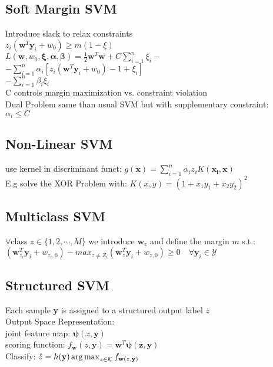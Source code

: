\subsection*{Soft Margin SVM}
Introduce slack to relax constraints\\
$z_i(\mathbf{w}^T\mathbf{y}_i+w_0)\geq m(1-\xi)$\\
$L(\mathbf{w}, w_0,\mathbf{\xi}, \mathbf{\alpha}, \mathbf{\beta}) {=}\frac{1}{2}\mathbf{w}^T\mathbf{w}+C\sum_{i=1}^n\xi_i-$\\
${-}\sum_{i=1}^n\alpha_i[z_i(\mathbf{w}^T\mathbf{y}_i{+}w_0){-}1{+}\xi_i]$\\
${-}\sum_{i=1}^n\beta_i\xi_i$\\
C controls margin maximization vs. constraint violation\\
Dual Problem same than usual SVM but with supplementary constraint:\\
$\alpha_i\leq C$

\subsection*{Non-Linear SVM}
use kernel in discriminant funct: $g(\mathbf{x})=\sum_{i=1}^n\alpha_iz_iK(\mathbf{x_i},\mathbf{x})$\\
E.g solve the XOR Problem with:
$K(x,y)=(1+x_1y_1+x_2y_2)^2$

\subsection*{Multiclass SVM}
$\forall$class $z\in\{1,2,\cdots,M\}$ we introduce $\mathbf{w}_z$ and define the margin $m$ s.t.:\\
$(\mathbf{w}_{z_i}^T\mathbf{y}_i+w_{z_i,0})-max_{z\not=Z_i}(\mathbf{w}_z^T\mathbf{y}_i+w_{z,0})\geq 0 \quad \forall\mathbf{y}_i\in \mathcal{Y}$

\subsection*{Structured SVM}
Each sample \textbf{y} is assigned to a structured output label $z$\\
Output Space Representation:\\
joint feature map: $\mathbf{\psi}(z,\mathbf{y})$\\
scoring function: $f_{\mathbf{w}}(z,\mathbf{y})=\mathbf{w}^T\mathbf{\psi(z, \mathbf{y})}$\\
Classify: $\hat{z}=h(\mathbf{y})\operatorname*{arg\,max}_{z\in\mathcal{K}}f_{\mathbf{w}(z, \mathbf{y})}$


